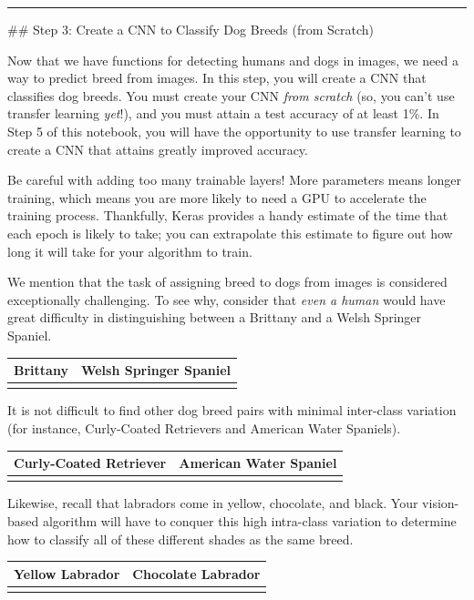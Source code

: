 \documentclass[11pt]{article}
\begin{document}
    \begin{center}\rule{0.5\linewidth}{\linethickness}\end{center}

 \#\# Step 3: Create a CNN to Classify Dog Breeds (from Scratch)

Now that we have functions for detecting humans and dogs in images, we
need a way to predict breed from images. In this step, you will create a
CNN that classifies dog breeds. You must create your CNN \emph{from
scratch} (so, you can't use transfer learning \emph{yet}!), and you must
attain a test accuracy of at least 1\%. In Step 5 of this notebook, you
will have the opportunity to use transfer learning to create a CNN that
attains greatly improved accuracy.

Be careful with adding too many trainable layers! More parameters means
longer training, which means you are more likely to need a GPU to
accelerate the training process. Thankfully, Keras provides a handy
estimate of the time that each epoch is likely to take; you can
extrapolate this estimate to figure out how long it will take for your
algorithm to train.

We mention that the task of assigning breed to dogs from images is
considered exceptionally challenging. To see why, consider that
\emph{even a human} would have great difficulty in distinguishing
between a Brittany and a Welsh Springer Spaniel.

\begin{longtable}[]{@{}ll@{}}
\toprule
Brittany & Welsh Springer Spaniel\tabularnewline
\midrule
\endhead
&\tabularnewline
\bottomrule
\end{longtable}

It is not difficult to find other dog breed pairs with minimal
inter-class variation (for instance, Curly-Coated Retrievers and
American Water Spaniels).

\begin{longtable}[]{@{}ll@{}}
\toprule
Curly-Coated Retriever & American Water Spaniel\tabularnewline
\midrule
\endhead
&\tabularnewline
\bottomrule
\end{longtable}

Likewise, recall that labradors come in yellow, chocolate, and black.
Your vision-based algorithm will have to conquer this high intra-class
variation to determine how to classify all of these different shades as
the same breed.

\begin{longtable}[]{@{}ll@{}}
\toprule
Yellow Labrador & Chocolate Labrador\tabularnewline
\midrule
\endhead
&\tabularnewline
\bottomrule
\end{longtable}
\end{document}
